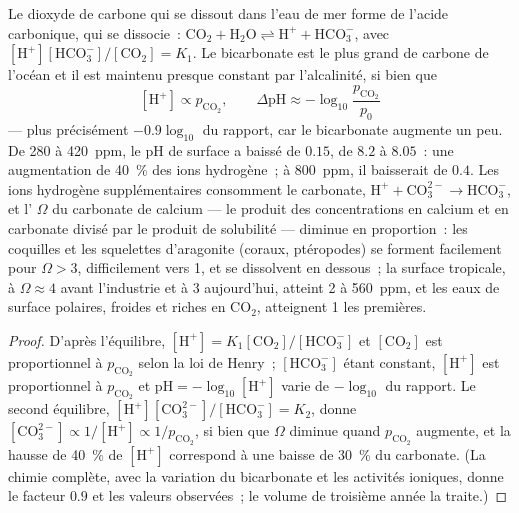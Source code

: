 \begin{theorem}[L'acidification]\label{thm:b2:global-change:acid}
Le dioxyde de carbone qui se dissout dans l'eau de mer forme de l'acide
carbonique, qui se dissocie~: $\ensuremath{\mathrm{CO_2}} + \ensuremath{\mathrm{H_2O}} \rightleftharpoons \ensuremath{\mathrm{H^{+}}} +
\ensuremath{\mathrm{HCO_3^{-}}}$, avec $[\ensuremath{\mathrm{H^{+}}}][\ensuremath{\mathrm{HCO_3^{-}}}]/[\ensuremath{\mathrm{CO_2}}] = K_1$.
Le bicarbonate est le plus grand  de carbone de l'océan et il est
maintenu presque constant par l'alcalinité, si bien que
\[
[\ensuremath{\mathrm{H^{+}}}] \propto p_{\ensuremath{\mathrm{CO_2}}}, \qquad
\Delta\mathrm{pH} \approx -\log_{10}\frac{p_{\ensuremath{\mathrm{CO_2}}}}{p_0}
\]
--- plus précisément $-0.9\log_{10}$ du rapport, car le bicarbonate
augmente un peu. De 280 à \qty{420}{ppm}, le pH de surface a baissé de
$0.15$, de $8.2$ à $8.05$~: une augmentation de \qty{40}{\%} des ions
hydrogène~; à \qty{800}{ppm}, il baisserait de $0.4$. Les ions hydrogène
supplémentaires consomment le carbonate, $\ensuremath{\mathrm{H^{+}}} + \ensuremath{\mathrm{CO_3^{2-}}} \to \ensuremath{\mathrm{HCO_3^{-}}}$, et
l'\emph{} $\Omega$ du carbonate de calcium --- le
produit des concentrations en calcium et en carbonate divisé par le
produit de solubilité --- diminue en proportion~: les coquilles et les
squelettes d'aragonite (coraux, ptéropodes) se forment facilement pour
$\Omega > 3$, difficilement vers 1, et se dissolvent en dessous~; la
surface tropicale, à $\Omega \approx 4$ avant l'industrie et à 3
aujourd'hui, atteint 2 à
\qty{560}{ppm}, et les eaux de surface polaires, froides et riches en
\ensuremath{\mathrm{CO_2}}, atteignent 1 les premières.
\end{theorem}
\begin{proof}
D'après l'équilibre, $[\ensuremath{\mathrm{H^{+}}}] = K_1[\ensuremath{\mathrm{CO_2}}]/[\ensuremath{\mathrm{HCO_3^{-}}}]$ et
$[\ensuremath{\mathrm{CO_2}}]$ est proportionnel à $p_{\ensuremath{\mathrm{CO_2}}}$ selon la loi de Henry~;
$[\ensuremath{\mathrm{HCO_3^{-}}}]$ étant constant, $[\ensuremath{\mathrm{H^{+}}}]$ est proportionnel à
$p_{\ensuremath{\mathrm{CO_2}}}$ et $\mathrm{pH} = -\log_{10}[\ensuremath{\mathrm{H^{+}}}]$ varie de
$-\log_{10}$ du rapport. Le second équilibre, $[\ensuremath{\mathrm{H^{+}}}][\ensuremath{\mathrm{CO_3^{2-}}}]/[\ensuremath{\mathrm{HCO_3^{-}}}]
= K_2$, donne $[\ensuremath{\mathrm{CO_3^{2-}}}] \propto 1/[\ensuremath{\mathrm{H^{+}}}] \propto
1/p_{\ensuremath{\mathrm{CO_2}}}$, si bien que $\Omega$ diminue quand $p_{\ensuremath{\mathrm{CO_2}}}$ augmente, et
la hausse de \qty{40}{\%} de $[\ensuremath{\mathrm{H^{+}}}]$ correspond à une baisse de
\qty{30}{\%} du carbonate. (La chimie complète, avec la variation du
bicarbonate et les activités ioniques, donne le facteur $0.9$ et les
valeurs observées~; le volume de troisième année la traite.)
\end{proof}
